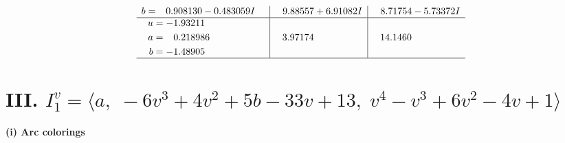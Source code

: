 \documentclass[1p]{elsarticle_modified}
\theoremstyle{definition}
\begin{document}
$$\begin{array}{c|c|c}
\begin{aligned}
b &= \phantom{-}0.908130 - 0.483059 I\end{aligned}
 & \phantom{-}9.88557 + 6.91082 I & \phantom{-}8.71754 - 5.73372 I \\ \hline\begin{aligned}
u &= -1.93211\phantom{ +0.000000I} \\
a &= \phantom{-}0.218986\phantom{ +0.000000I} \\
b &= -1.48905\phantom{ +0.000000I}\end{aligned}
 & \phantom{-}3.97174\phantom{ +0.000000I} & \phantom{-}14.1460\phantom{ +0.000000I}\\
 \hline 
 \end{array}$$\newpage\newpage\renewcommand{\arraystretch}{1}
\centering \section*{III. $I^v_{1}= \langle a,\;-6 v^3+4 v^2+5 b-33 v+13,\;v^4- v^3+6 v^2-4 v+1 \rangle$}
\flushleft \textbf{(i) Arc colorings}\\
\end{document}

